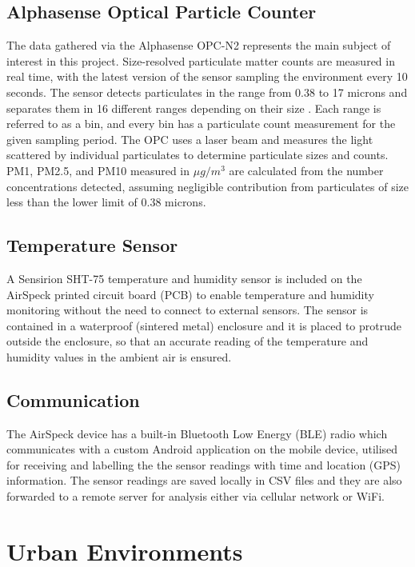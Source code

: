 \documentclass[bsc,frontabs,twoside,singlespacing, parskip,deptreport]{infthesis}     %
\begin{document}
\subsection*{Alphasense Optical Particle Counter}

The data gathered via the Alphasense OPC-N2 \cite{opc} represents the main subject of interest in this project. Size-resolved particulate matter counts are measured in real time, with the latest version of the sensor sampling the environment every 10 seconds. The sensor detects particulates in the range from 0.38 to 17 microns and separates them in 16 different ranges depending on their size \cite{airspeck}. Each range is referred to as a bin, and every bin has a particulate count measurement for the given sampling period. The OPC uses a laser beam and measures the light scattered by individual particulates to determine particulate sizes and counts. PM1, PM2.5, and PM10 measured in $ \mu g /m^3 $ are calculated from the number concentrations detected, assuming negligible contribution from particulates of size less than the lower limit of 0.38 microns.


\subsection*{Temperature Sensor}

A Sensirion SHT-75 temperature and humidity sensor \cite{sensirion} is included on the AirSpeck printed circuit board (PCB) to enable temperature and humidity monitoring without the need to connect to external sensors. The sensor is contained in a waterproof (sintered metal) enclosure \cite{airspeck} and it is placed to protrude outside the enclosure, so that an accurate reading of the temperature and humidity values in the ambient air is ensured.


\subsection*{Communication}

The AirSpeck device has a built-in Bluetooth Low Energy (BLE) radio which communicates with a custom Android application on the mobile device, utilised for receiving and labelling the the sensor readings with time and location (GPS) information. The sensor readings are saved locally in CSV files and they are also forwarded to a remote server for analysis either via cellular network or WiFi.

\section{Urban Environments}
\label{sec:urban-environments}
\end{document}
